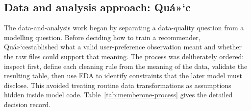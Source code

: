 \documentclass[12pt,a4paper]{article}
\newcommand{\memberone}{Mai Nam Quá»‘c -- 29211145181}
\renewcommand{\memberone}{Quá»‘c}
\begin{document}
\subsection{Data and analysis approach: \memberone}
The data-and-analysis work began by separating a data-quality question from a modelling question. Before deciding how to train a recommender, \memberone established what a valid user-preference observation meant and whether the raw files could support that meaning. The process was deliberately ordered: inspect first, define each cleaning rule from the meaning of the data, validate the resulting table, then use EDA to identify constraints that the later model must disclose. This avoided treating routine data transformations as assumptions hidden inside model code. Table~\ref{tab:memberone-process} gives the detailed decision record.
\end{document}
